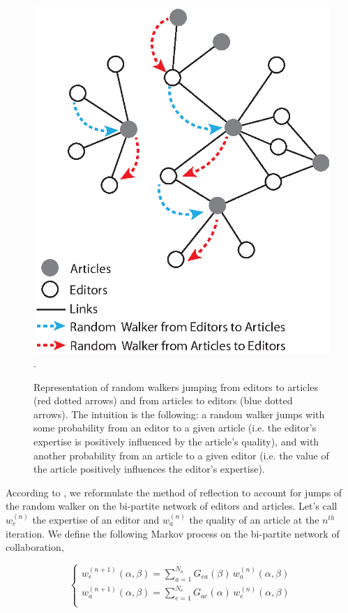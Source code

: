 \begin{figure}[!t]
\centering
\includegraphics[width=0.7\columnwidth]{../Figures/bi-partite_net.eps}.
\caption{Representation of random walkers jumping from editors to articles (red dotted arrows) and from articles to editors (blue dotted arrows). The intuition is the following: a random walker jumps with some probability from an editor to a given article (i.e. the editor's expertise is positively influenced by the article's quality), and with another probability from an article to a given editor (i.e. the value of the article positively influences the editor's expertise).}
\label{fig:jumpers}
\end{figure}

According to  \cite{caldarelli2012network}, we reformulate the method of reflection to account for jumps of the random walker on the bi-partite network of editors and articles. Let's call $w^{(n)}_e$ the expertise of an editor and $w^{(n)}_a$ the quality of an article at the $n^{th}$ iteration. We define the following Markov process on the bi-partite network of collaboration, 

\begin{equation}
\begin{cases}
w^{(n+1)}_e (\alpha,\beta) = \sum_{a=1}^{N_a}  G_{ea}(\beta) \,w^{(n)}_a (\alpha,\beta)\\[7pt]
w^{(n+1)}_a (\alpha,\beta) = \sum_{e=1}^{N_e}  G_{ae}(\alpha) \, w^{(n)}_e (\alpha,\beta)\\
\end{cases}
\label{random_walker}
\end{equation}

